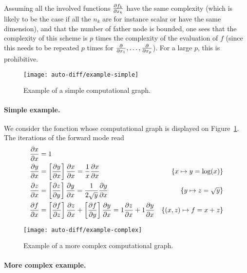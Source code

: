 Assuming all the involved functions $\frac{ \partial f_k}{\partial x_k}$ have the same complexity (which is likely to be the case if all the $n_k$ are for instance scalar or have the same dimension), and that the number of father node is bounded, one sees that the complexity of this scheme is $p$ times the complexity of the evaluation of $f$ (since this needs to be repeated $p$ times for $\frac{ \partial }{\partial x_1},\ldots,\frac{ \partial }{\partial x_p}$). For a large $p$, this is prohibitive. 

\begin{figure}
\centering
\texttt{[image: auto-diff/example-simple]}
\caption{\label{fig-dag-example-simple}
Example of a simple computational graph.
}
\end{figure}




\paragraph{Simple example.}

We consider the fonction 
whose computational graph is displayed on Figure~\ref{fig-dag-example-simple}. The iterations of the forward mode read
\begin{align*}
		\frac{ \partial x}{\partial x} &= 1 \\
		\frac{ \partial y}{\partial x} &= \left[\frac{ \partial y}{\partial x}\right] \frac{ \partial x}{\partial x} = \frac{1}{x} \frac{ \partial x}{\partial x} &
			\{x \mapsto y = \log(x)\}\\
		\frac{ \partial z}{\partial x} &= \left[\frac{ \partial z}{\partial y}\right] \frac{ \partial y}{\partial x} = \frac{1}{2\sqrt{y}} \frac{ \partial y}{\partial x} &
			\{y \mapsto z=\sqrt{y}\}\\
		\frac{ \partial f}{\partial x} &= \left[\frac{ \partial f}{\partial z}\right] \frac{ \partial z}{\partial x} + \left[\frac{ \partial f}{\partial y}\right] \frac{ \partial y}{\partial x} = 1 \frac{ \partial z}{\partial x} + 1 \frac{ \partial y}{\partial x}&
			\{(x,z) \mapsto f=x+z\}
\end{align*}



\begin{figure}
\centering
\texttt{[image: auto-diff/example-complex]}
\caption{\label{fig-dag-example-complex}
Example of a more complex computational graph.
}
\end{figure}

\paragraph{More complex example.}

